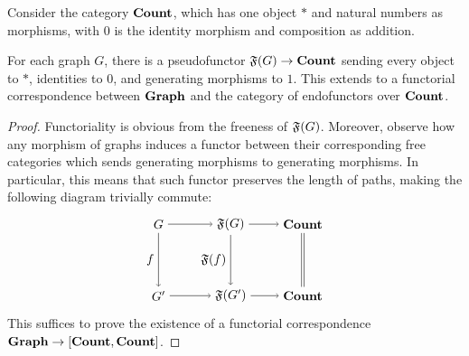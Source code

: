 %
%
\begingroup
\def\thetheoremUnified{\ref{thm: path functor}}
\begin{lemma}
  Consider the category $\textbf{Count}$, which has one object $*$ and 
  natural numbers as morphisms, with $0$ is the identity morphism 
  and composition as addition. 

  For each graph $G$, there is a pseudofunctor $\mathfrak{F}(G) \to \textbf{Count}$ sending 
  every object to  $*$, identities to $0$, and generating morphisms to $1$.
  This extends to a functorial correspondence between $\textbf{Graph}$ and the 
  category of endofunctors over $\textbf{Count}$.
\end{lemma}
\addtocounter{theoremUnified}{-1}
\endgroup
\begin{proof}
  Functoriality is obvious from the freeness of $\mathfrak{F}(G)$.
  Moreover, observe how any morphism of graphs induces a functor between 
  their corresponding free categories which sends generating morphisms 
  to generating morphisms. In particular, this means that such 
  functor preserves the length of paths, making the following diagram 
  trivially commute:
  \begin{equation*}
    \begin{tikzpicture}
      \node (G') at (-2,0) {$G'$}; 
      \node (G) at (-2,2) {$G$};
      \node (FG') at (0,0) {$\Free{G'}$}; 
      \node (FG) at (0,2) {$\Free{G}$};
      \node (Count') at (2,0) {$\Count$};
      \node (Count) at (2,2) {$\Count$};
      \draw[->] (G) -- node[left] {$f$} (G');
      \draw[->] (G) -- (FG);
      \draw[->] (G') -- (FG');
      \draw[->] (FG) -- node[left] {$\Free{f}$} (FG');
      \draw[->] (FG) -- (Count);
      \draw[->] (FG') -- (Count');
      \draw[transform canvas={xshift=-1pt}, -] (Count) -- (Count');
      \draw[transform canvas={xshift=1pt}, -] (Count) -- (Count');
    \end{tikzpicture}
  \end{equation*}
  This suffices to prove the existence of a functorial correspondence $\textbf{Graph} \to [\textbf{Count}, \textbf{Count}]$.
\end{proof}
%
%
\begingroup
\def\thetheoremUnified{\ref{thm: graph functor}}
